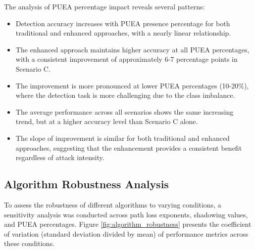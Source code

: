 The analysis of PUEA percentage impact reveals several patterns:

\begin{itemize}
    \item Detection accuracy increases with PUEA presence percentage for both traditional and enhanced approaches, with a nearly linear relationship.
    
    \item The enhanced approach maintains higher accuracy at all PUEA percentages, with a consistent improvement of approximately 6-7 percentage points in Scenario C.
    
    \item The improvement is more pronounced at lower PUEA percentages (10-20\%), where the detection task is more challenging due to the class imbalance.
    
    \item The average performance across all scenarios shows the same increasing trend, but at a higher accuracy level than Scenario C alone.
    
    \item The slope of improvement is similar for both traditional and enhanced approaches, suggesting that the enhancement provides a consistent benefit regardless of attack intensity.
\end{itemize}

\subsection{Algorithm Robustness Analysis}

To assess the robustness of different algorithms to varying conditions, a sensitivity analysis was conducted across path loss exponents, shadowing values, and PUEA percentages. Figure \ref{fig:algorithm_robustness} presents the coefficient of variation (standard deviation divided by mean) of performance metrics across these conditions.

